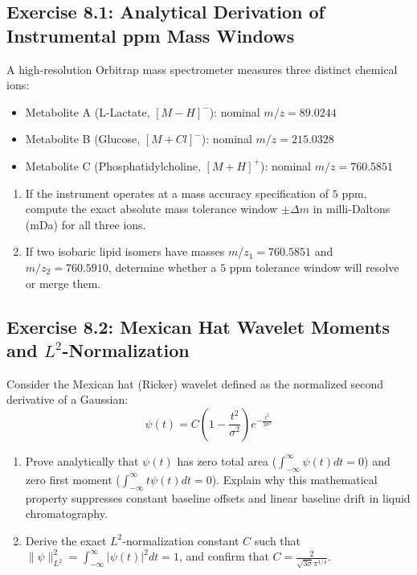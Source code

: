 \documentclass[11pt,twoside,openright]{book}
\begin{document}
\subsection*{Exercise 8.1: Analytical Derivation of Instrumental ppm Mass Windows}
A high-resolution Orbitrap mass spectrometer measures three distinct chemical ions:
\begin{itemize}
    \item Metabolite A (L-Lactate, $[M-H]^-$): nominal $m/z = 89.0244$
    \item Metabolite B (Glucose, $[M+Cl]^-$): nominal $m/z = 215.0328$
    \item Metabolite C (Phosphatidylcholine, $[M+H]^+$): nominal $m/z = 760.5851$
\end{itemize}
\begin{enumerate}
    \item If the instrument operates at a mass accuracy specification of $5\text{ ppm}$, compute the exact absolute mass tolerance window $\pm \Delta m$ in milli-Daltons (mDa) for all three ions.
    \item If two isobaric lipid isomers have masses $m/z_1 = 760.5851$ and $m/z_2 = 760.5910$, determine whether a $5\text{ ppm}$ tolerance window will resolve or merge them.
\end{enumerate}

\subsection*{Exercise 8.2: Mexican Hat Wavelet Moments and $L^2$-Normalization}
Consider the Mexican hat (Ricker) wavelet defined as the normalized second derivative of a Gaussian:
\begin{equation*}
\psi(t) = C \left( 1 - \frac{t^2}{\sigma^2} \right) e^{-\frac{t^2}{2\sigma^2}}
\end{equation*}
\begin{enumerate}
    \item Prove analytically that $\psi(t)$ has zero total area ($\int_{-\infty}^\infty \psi(t) dt = 0$) and zero first moment ($\int_{-\infty}^\infty t \psi(t) dt = 0$). Explain why this mathematical property suppresses constant baseline offsets and linear baseline drift in liquid chromatography.
    \item Derive the exact $L^2$-normalization constant $C$ such that $\|\psi\|_{L^2}^2 = \int_{-\infty}^\infty |\psi(t)|^2 dt = 1$, and confirm that $C = \frac{2}{\sqrt{3\sigma}\pi^{1/4}}$.
\end{enumerate}
\end{document}
